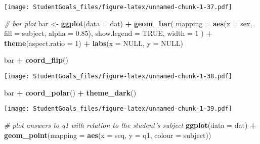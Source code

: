 \documentclass[]{article}
\newenvironment{Shaded}{\begin{snugshade}}{\end{snugshade}}
\newcommand{\CommentTok}[1]{\textcolor[rgb]{0.56,0.35,0.01}{\textit{#1}}}
\newcommand{\DataTypeTok}[1]{\textcolor[rgb]{0.13,0.29,0.53}{#1}}
\newcommand{\DecValTok}[1]{\textcolor[rgb]{0.00,0.00,0.81}{#1}}
\newcommand{\FloatTok}[1]{\textcolor[rgb]{0.00,0.00,0.81}{#1}}
\newcommand{\KeywordTok}[1]{\textcolor[rgb]{0.13,0.29,0.53}{\textbf{#1}}}
\newcommand{\NormalTok}[1]{#1}
\newcommand{\OperatorTok}[1]{\textcolor[rgb]{0.81,0.36,0.00}{\textbf{#1}}}
\newcommand{\OtherTok}[1]{\textcolor[rgb]{0.56,0.35,0.01}{#1}}
\newcommand{\StringTok}[1]{\textcolor[rgb]{0.31,0.60,0.02}{#1}}
\begin{document}
\texttt{[image: StudentGoals\_files/figure-latex/unnamed-chunk-1-37.pdf]}

\begin{Shaded}
\begin{Highlighting}[]
\CommentTok{# bar plot}
\NormalTok{bar <-}\StringTok{ }\KeywordTok{ggplot}\NormalTok{(}\DataTypeTok{data =}\NormalTok{ dat) }\OperatorTok{+}\StringTok{ }
\StringTok{  }\KeywordTok{geom_bar}\NormalTok{(}
    \DataTypeTok{mapping =} \KeywordTok{aes}\NormalTok{(}\DataTypeTok{x =}\NormalTok{ sex, }\DataTypeTok{fill =}\NormalTok{ subject, }\DataTypeTok{alpha =} \FloatTok{0.85}\NormalTok{), }
    \DataTypeTok{show.legend =} \OtherTok{TRUE}\NormalTok{,}
    \DataTypeTok{width =} \DecValTok{1}
\NormalTok{  ) }\OperatorTok{+}\StringTok{ }
\StringTok{  }\KeywordTok{theme}\NormalTok{(}\DataTypeTok{aspect.ratio =} \DecValTok{1}\NormalTok{) }\OperatorTok{+}
\StringTok{  }\KeywordTok{labs}\NormalTok{(}\DataTypeTok{x =} \OtherTok{NULL}\NormalTok{, }\DataTypeTok{y =} \OtherTok{NULL}\NormalTok{)}

\NormalTok{bar }\OperatorTok{+}\StringTok{ }\KeywordTok{coord_flip}\NormalTok{()}
\end{Highlighting}
\end{Shaded}

\texttt{[image: StudentGoals\_files/figure-latex/unnamed-chunk-1-38.pdf]}

\begin{Shaded}
\begin{Highlighting}[]
\NormalTok{bar }\OperatorTok{+}\StringTok{ }\KeywordTok{coord_polar}\NormalTok{() }\OperatorTok{+}\StringTok{ }\KeywordTok{theme_dark}\NormalTok{()}
\end{Highlighting}
\end{Shaded}

\texttt{[image: StudentGoals\_files/figure-latex/unnamed-chunk-1-39.pdf]}

\begin{Shaded}
\begin{Highlighting}[]
\CommentTok{# plot answers to q1 with relation to the student's subject}
\KeywordTok{ggplot}\NormalTok{(}\DataTypeTok{data =}\NormalTok{ dat) }\OperatorTok{+}\StringTok{ }
\StringTok{  }\KeywordTok{geom_point}\NormalTok{(}\DataTypeTok{mapping =} \KeywordTok{aes}\NormalTok{(}\DataTypeTok{x =}\NormalTok{ seq, }\DataTypeTok{y =}\NormalTok{ q1, }\DataTypeTok{colour =}\NormalTok{ subject))}
\end{Highlighting}
\end{Shaded}
\end{document}
